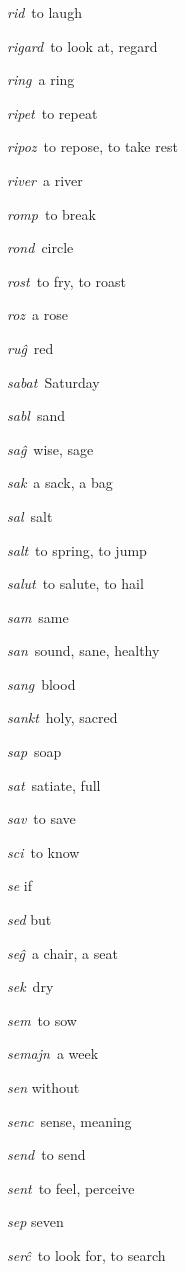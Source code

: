 \begin{landscape}
\begin{multicols}{5}
\begin{outdent}{1em}
\emph{rid\,} to laugh

\emph{rigard\,} to look at, regard

\emph{ring\,} a ring

\emph{ripet\,} to repeat

\emph{ripoz\,} to repose, to take rest

\emph{river\,} a river

\emph{romp\,} to break

\emph{rond\,} circle

\emph{rost\,} to fry, to roast

\emph{roz\,} a rose

\emph{ruĝ\,} red
\end{outdent}


\begin{outdent}{1em}
\emph{sabat\,} Saturday

\emph{sabl\,} sand

\emph{saĝ\,} wise, sage

\emph{sak\,} a sack, a bag

\emph{sal\,} salt

\emph{salt\,} to spring, to jump

\emph{salut\,} to salute, to hail 

\emph{sam\,} same

\emph{san\,} sound, sane, healthy

\emph{sang\,} blood

\emph{sankt\,} holy, sacred

\emph{sap\,} soap

\emph{sat\,} satiate, full

\emph{sav\,} to save

\emph{sci\,} to know

\emph{se} if

\emph{sed} but

\emph{seĝ\,} a chair, a seat

\emph{sek\,} dry

\emph{sem\,} to sow

\emph{semajn\,} a week

\emph{sen} without

\emph{senc\,} sense, meaning

\emph{send\,} to send

\emph{sent\,} to feel, perceive

\emph{sep} seven

\emph{serĉ\,} to look for, to search


\end{outdent}
\end{multicols}
\end{landscape}
